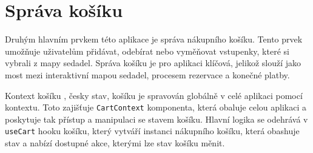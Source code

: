 \section{Správa košíku}
\label{sec:implementace-kosik}
Druhým hlavním prvkem této aplikace je správa nákupního košíku.
Tento prvek umožňuje uživatelům přidávat, odebírat nebo vyměňovat vstupenky, které si vybrali z mapy sedadel.
Správa košíku je pro aplikaci klíčová, jelikož slouží jako most mezi interaktivní mapou sedadel, procesem rezervace a konečné platby.

\begin{subsection}{Kontext košíku}
    \label{subsec:implementace-kosik-kontext}
    , česky stav, košíku je spravován globálně v celé aplikaci pomocí kontextu.
    Toto zajišťuje \texttt{CartContext} komponenta, která obaluje celou aplikaci a poskytuje tak přístup a manipulaci se stavem košíku.
    Hlavní logika se odehrává v \texttt{useCart} hooku košíku, který vytváří instanci nákupního košíku, která obashuje stav a nabízí dostupné akce, kterými lze stav košíku měnit.
\end{subsection}

